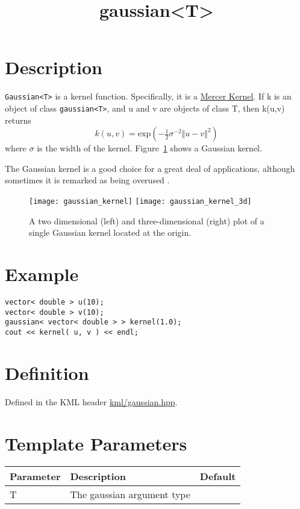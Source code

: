\documentclass{article}
\newcommand{\half}{\tfrac{1}{2}}
\begin{document}
\title{gaussian<T>}
\maketitle

\section*{Description}

\texttt{Gaussian<T>} is a kernel function. Specifically, it is a \href{\kmlroot/mercer_kernel.html}{Mercer Kernel}. If k is an object of class \texttt{gaussian<T>}, and u and v are objects of class T, then k(u,v) returns
%
$$k(u,v) = \textrm{exp}( - \half \sigma^{-2} \Vert u-v \Vert^2 ) $$
%
where $\sigma$ is the width of the kernel. 
Figure~\ref{figure:gaussian_kernel} shows a Gaussian kernel.

The Gaussian kernel is a good choice for a great deal of applications, although sometimes it is remarked as being
overused \cite{scholkopf02learning}.

\begin{figure}
\texttt{[image: gaussian\_kernel]}
\texttt{[image: gaussian\_kernel\_3d]}
\caption{A two dimensional (left) and three-dimensional (right) plot of a single Gaussian kernel located at the origin.}
\label{figure:gaussian_kernel}
\end{figure}



\section*{Example}


\highlightcpp{}
\begin{verbatim}
vector< double > u(10);
vector< double > v(10);
gaussian< vector< double > > kernel(1.0);
cout << kernel( u, v ) << endl;
\end{verbatim}


\section*{Definition}

Defined in the KML header \href{\kmlsvnroot/kml/gaussian.hpp}{kml/gaussian.hpp}.


\section*{Template Parameters}

\begin{tabular}{lll}
\textbf{Parameter} & \textbf{Description} & \textbf{Default} \\ 
\hline
T & The gaussian argument type \\ 
\end{tabular}
\end{document}
